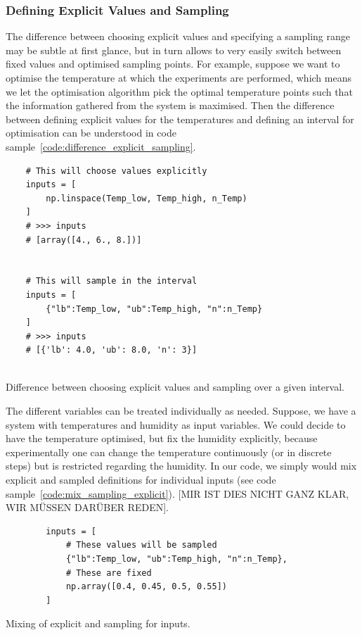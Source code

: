 \documentclass[10pt,A4paper]{article}
\begin{document}
\subsubsection*{Defining Explicit Values and Sampling}
The difference between choosing explicit values and specifying a sampling range may be subtle at first glance, but in turn allows to very easily switch between fixed values and optimised sampling points.
For example, suppose we want to optimise the temperature at which the experiments are performed, which means we let the optimisation algorithm pick the optimal temperature points such that the information gathered from the system is maximised.
Then the difference between defining explicit values for the temperatures and defining an interval for optimisation can be understood in code sample~\ref{code:difference_explicit_sampling}.\newline
\begin{code}[h]
    \begin{verbatim}
    # This will choose values explicitly
    inputs = [
        np.linspace(Temp_low, Temp_high, n_Temp)
    ]
    # >>> inputs
    # [array([4., 6., 8.])]


    # This will sample in the interval
    inputs = [
        {"lb":Temp_low, "ub":Temp_high, "n":n_Temp}
    ]
    # >>> inputs
    # [{'lb': 4.0, 'ub': 8.0, 'n': 3}]


    \end{verbatim}
    \caption{Difference between choosing explicit values and sampling over a given interval.}
    \label{code:difference_explicit_sampling}
\end{code}%
The different variables can be treated individually as needed.
Suppose, we have a system with temperatures and humidity as input variables.
We could decide to have the temperature optimised, but fix the humidity explicitly, because experimentally one can change the temperature continuously (or in discrete steps) but is restricted regarding the humidity.
In our code, we simply would mix explicit and sampled definitions for individual inputs (see code sample~\ref{code:mix_sampling_explicit}).
[MIR IST DIES NICHT GANZ KLAR, WIR MÜSSEN DARÜBER REDEN].
\begin{code}[h]
    \begin{verbatim}
        inputs = [
            # These values will be sampled
            {"lb":Temp_low, "ub":Temp_high, "n":n_Temp},
            # These are fixed
            np.array([0.4, 0.45, 0.5, 0.55])
        ]
    \end{verbatim}
    \caption{Mixing of explicit and sampling for inputs.}
    \label{code:mix_sampling_explicit}
\end{code}
%
\end{document}
